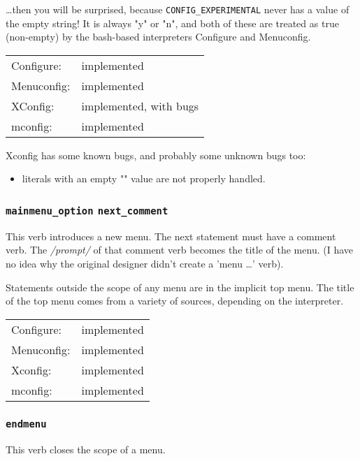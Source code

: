\dots then you will be surprised, because \texttt{CONFIG\_EXPERIMENTAL} never 
has a
value of the empty string!  It is always "y" or "n", and both of these
are treated as true (non-empty) by the bash-based interpreters Configure
and Menuconfig.

\begin{tabular}{ll}
Configure:  &implemented\\
Menuconfig: &implemented\\
XConfig:    &implemented, with bugs\\
mconfig:    &implemented\\
\end{tabular}

Xconfig has some known bugs, and probably some unknown bugs too:
\begin{itemize}
\item literals with an empty "" value are not properly handled.
\end{itemize}



\subsubsection{\texttt{mainmenu\_option} \quad\texttt{next\_comment}}

This verb introduces a new menu.  The next statement must have a comment
verb.  The \textit{/prompt/} of that comment verb becomes the title of the menu.
(I have no idea why the original designer didn't create a 'menu \dots' verb).

Statements outside the scope of any menu are in the implicit top menu.
The title of the top menu comes from a variety of sources, depending on
the interpreter.

\begin{tabular}{ll}
Configure:  &implemented\\
Menuconfig: &implemented\\
Xconfig:    &implemented\\
mconfig:    &implemented\\
\end{tabular}



\subsubsection{\texttt{endmenu}}

This verb closes the scope of a menu.

